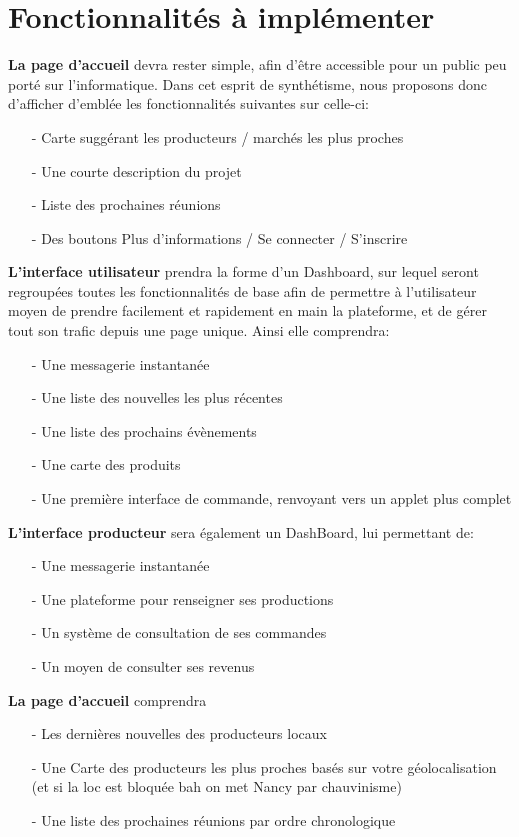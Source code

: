 \chapter*{Fonctionnalités à implémenter}
\textbf{La page d'accueil} devra rester simple, afin d’être accessible pour un public peu porté sur l’informatique. Dans cet esprit de synthétisme, nous proposons donc d’afficher d’emblée les fonctionnalités suivantes sur celle-ci:
\begin{itemize}
	\item[-] Carte suggérant les producteurs / marchés les plus proches
	\item[-] Une courte description du projet
	\item[-] Liste des prochaines réunions
	\item[-] Des boutons Plus d’informations / Se connecter / S’inscrire
\end{itemize}

\textbf{L’interface utilisateur} prendra la forme d’un Dashboard, sur lequel seront regroupées toutes les fonctionnalités de base afin de permettre à l’utilisateur moyen de prendre facilement et rapidement en main la plateforme, et de gérer tout son trafic depuis une page unique. Ainsi elle comprendra:
\begin{itemize}
	\item[-] Une messagerie instantanée
	\item[-] Une liste des nouvelles les plus récentes
	\item[-] Une liste des prochains évènements
	\item[-] Une carte des produits
	\item[-] Une première interface de commande, renvoyant vers un applet plus complet
\end{itemize}

\textbf{L’interface producteur} sera également un DashBoard, lui permettant de:
\begin{itemize}
	\item[-] Une messagerie instantanée
	\item[-] Une plateforme pour renseigner ses productions
	\item[-] Un système de consultation de ses commandes
	\item[-] Un moyen de consulter ses revenus
\end{itemize}

\textbf{La page d'accueil} comprendra
\begin{itemize}
	\item[-] Les dernières nouvelles des producteurs locaux
	\item[-] Une Carte des producteurs les plus proches basés sur votre géolocalisation (et si la loc est bloquée bah on met Nancy par chauvinisme)
	\item[-] Une liste des prochaines réunions par ordre chronologique
\end{itemize}

